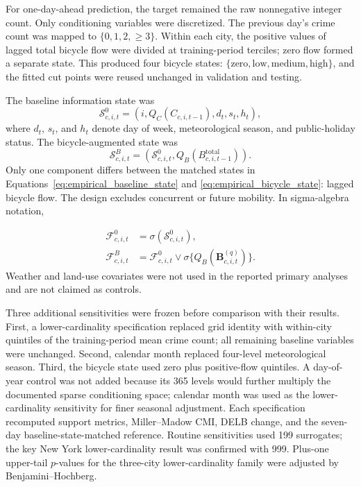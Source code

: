 \documentclass[applsci,article,accept,moreauthors]{Definitions/mdpi}
\def\hl#1{#1}%
\begin{document}
For one-day-ahead prediction, the target remained the raw nonnegative
integer count. Only conditioning variables were discretized. The previous
day's crime count was mapped to
\(\{0,1,2,\geq 3\}\). Within each city, the positive values of lagged total
bicycle flow were divided at training-period terciles; zero flow formed a
separate state. This produced four bicycle states:
\(\{\text{zero},\text{low},\text{medium},\text{high}\}\), and the fitted
cut points were reused unchanged in validation and testing.

The baseline information state was
\begin{equation}
\mathcal{S}^{0}_{c,i,t}
=\left(i,Q_C(C_{c,i,t-1}),d_t,s_t,h_t\right),
\label{eq:empirical_baseline_state}
\end{equation}
where \(d_t\), \(s_t\), and \(h_t\) denote day of week, meteorological
season, and public-holiday status. The bicycle-augmented state was
\begin{equation}
\mathcal{S}^{B}_{c,i,t}
=\left(\mathcal{S}^{0}_{c,i,t},
Q_B(B^{\mathrm{total}}_{c,i,t-1})\right).
\label{eq:empirical_bicycle_state}
\end{equation}
Only one component differs between the matched states \hl{in Equations}~\eqref{eq:empirical_baseline_state} and
\eqref{eq:empirical_bicycle_state}: lagged bicycle flow.
The design excludes concurrent or future
mobility. In sigma-algebra notation,

\begin{align}
\mathcal F^0_{c,i,t}
&=\sigma(\mathcal S^0_{c,i,t}),
\label{eq:baseline_information}\\
\mathcal F^B_{c,i,t}
&=\mathcal F^0_{c,i,t}\vee
\sigma\{Q_B(\mathbf B^{(q)}_{c,i,t})\}.
\label{eq:bike_information}
\end{align}
Weather and land-use covariates were not used in the reported primary
analyses and are not claimed as controls.

{Three additional sensitivities were frozen before comparison with
their results. First, a lower-cardinality specification replaced grid
identity with within-city quintiles of the training-period mean crime count;
all remaining baseline variables were unchanged. Second, calendar month
replaced four-level meteorological season. Third, the bicycle state used zero
plus positive-flow quintiles. A day-of-year control was not added because its
365 levels would further multiply the documented sparse conditioning space;
calendar month was used as the lower-cardinality sensitivity for finer
seasonal adjustment. Each specification recomputed support metrics,
Miller--Madow CMI, DELB change, and the seven-day baseline-state-matched
reference. Routine sensitivities used 199 surrogates; the key New York
lower-cardinality result was confirmed with 999. Plus-one upper-tail
\(p\)-values for the three-city lower-cardinality family were adjusted by
Benjamini--Hochberg.}
\end{document}

